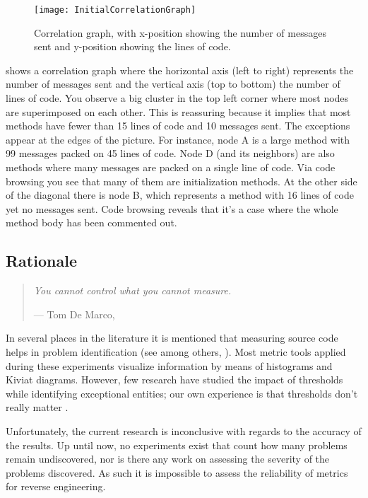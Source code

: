 \documentclass[a4paper,10pt,twoside]{book}
\begin{document}
\begin{figure}
\begin{center}
\texttt{[image: InitialCorrelationGraph]}
\caption{Correlation graph, with x-position showing the number of messages 
sent and y-position showing the lines of code.}
\end{center}
\end{figure}

 shows a correlation graph where the horizontal axis (left 
to right) represents the number of messages sent and the vertical axis (top to bottom) the 
number of lines of code. You observe a big cluster in the top left corner where most nodes 
are superimposed on each other. This is reassuring because it implies that most methods 
have fewer than 15 lines of code and 10 messages sent. The exceptions appear at the edges 
of the picture. For instance, node A is a large method with 99 messages packed on 45 lines 
of code. Node D (and its neighbors) are also methods where many messages are packed on a 
single line of code. Via code browsing you see that many of them are initialization 
methods. At the other side of the diagonal there is node B, which represents a method with 
16 lines of code yet no messages sent. Code browsing reveals that it's a case where the 
whole method body has been commented out.

\subsection*{Rationale}

\begin{quotation}
\noindent
\emph{You cannot control what you cannot measure.}

\hfill --- Tom De Marco, \cite{Dema82a}	 
\end{quotation}

In several places in the literature it is mentioned that measuring source code helps in 
problem identification (see among others, \cite{Lore94a} \cite{Fent96a} \cite{Mayr96a} 
\cite{Nesi98a}). Most metric tools applied during these experiments visualize information 
by means of histograms and Kiviat diagrams. However, few research have studied the impact 
of thresholds while identifying exceptional entities; our own experience is that thresholds 
don't really matter \cite{Deme99a}.

Unfortunately, the current research is inconclusive with regards to the accuracy of the 
results. Up until now, no experiments exist that count how many problems remain 
undiscovered, nor is there any work on assessing the severity of the problems discovered. 
As such it is impossible to assess the reliability of metrics for reverse engineering.
\end{document}
